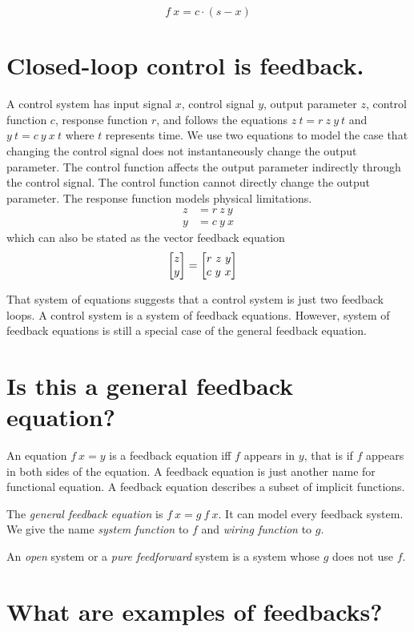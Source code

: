 \[
    f~x = c \cdot (s - x)
\]

\section{Closed-loop control is feedback.}

A control system has input signal \(x\), control signal \(y\), output parameter \(z\),
control function \(c\),
response function \(r\),
and follows the equations
\( z~t = r~z~y~t \)
and
\( y~t = c~y~x~t \)
where \(t\) represents time.
We use two equations to model the case
that changing the control signal
does not instantaneously change the output parameter.
The control function affects the output parameter indirectly through the control signal.
The control function cannot directly change the output parameter.
The response function models physical limitations.
\begin{align*}
    z &= r~z~y
    \\ y &= c~y~x
\end{align*}
which can also be stated as the vector feedback equation
\begin{align*}
    \begin{bmatrix}z \\ y\end{bmatrix} &= \begin{bmatrix}r~z~y \\ c~y~x\end{bmatrix}
\end{align*}

That system of equations suggests that a control system is just two feedback loops.
A control system is a system of feedback equations.
However, system of feedback equations is still a special case of the general feedback equation.

\section{Is this a general feedback equation?}

An equation \(f~x = y\) is a feedback equation iff \(f\) appears in \(y\),
that is if \(f\) appears in both sides of the equation.
A feedback equation is just another name for functional equation.
A feedback equation describes a subset of implicit functions.

The \emph{general feedback equation} is \(f ~ x = g ~ f ~ x\).
It can model every feedback system.
We give the name \emph{system function} to \(f\)
and \emph{wiring function} to \(g\).

An \emph{open} system or a \emph{pure feedforward} system
is a system whose \(g\) does not use \(f\).

\section{What are examples of feedbacks?}

